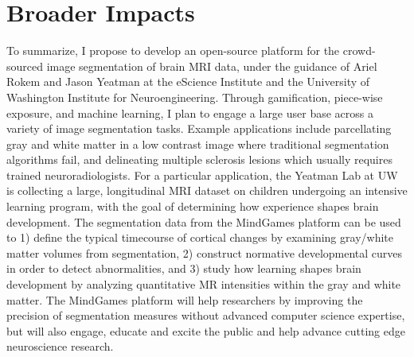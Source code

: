 \section*{Broader Impacts}

To summarize, I propose to develop an open-source platform for the crowd-sourced image segmentation of brain MRI data, under the guidance of Ariel Rokem and Jason Yeatman at the eScience Institute and the University of Washington Institute for Neuroengineering. Through gamification, piece-wise exposure, and machine learning, I plan to engage a large user base across a variety of image segmentation tasks. Example applications include parcellating gray and white matter in a low contrast image where traditional segmentation algorithms fail, and delineating multiple sclerosis lesions which usually requires trained neuroradiologists. For a particular application, the Yeatman Lab at UW is collecting a large, longitudinal MRI  dataset on children undergoing an intensive learning program, with the goal of determining how experience shapes brain development. The segmentation data from the MindGames platform can be used to 1) define the typical timecourse of cortical changes by examining gray/white matter volumes from segmentation, 2) construct normative developmental curves in order to detect abnormalities, and 3) study how learning shapes brain development by analyzing quantitative MR intensities within the gray and white matter. The MindGames platform will help researchers by improving the precision of segmentation measures without advanced computer science expertise, but will also engage, educate and excite the public and help advance cutting edge neuroscience research. 
